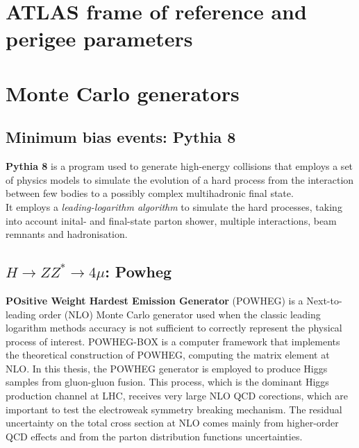 \documentclass[a4paper,twoside,12pt]{article}
\begin{document}
\begin{appendices}
\section{ATLAS frame of reference and perigee parameters} \label{appendix:perigee}

\section{Monte Carlo generators}\label{appendix:MC}
\subsection{Minimum bias events: Pythia 8}
\textbf{Pythia 8} is a program used to generate high-energy collisions that employs a set of physics
models to simulate the evolution of a hard process from the interaction between few bodies 
to a possibly complex multihadronic final state\cite{Pythia8}. 	\\
It employs a \textit{leading-logarithm algorithm} to simulate the hard processes, 
taking into account inital- and final-state parton shower, multiple interactions, beam remnants
and hadronisation. 

\subsection{$H \rightarrow ZZ^* \rightarrow 4\mu$: Powheg}
\textbf{POsitive Weight Hardest Emission Generator} (POWHEG) is a Next-to-leading order (NLO) Monte Carlo generator
used when the classic leading logarithm methods accuracy is not sufficient to correctly 
represent the physical process of interest. POWHEG-BOX is a computer framework 
that implements the theoretical construction of POWHEG, computing the matrix element 
at NLO\cite{Powheg}. In this thesis, the POWHEG generator is employed to produce
Higgs samples from gluon-gluon fusion. This process, which is the dominant Higgs production 
channel at LHC, receives very large NLO QCD corections, which are important to test the 
electroweak symmetry breaking mechanism\cite{Powheg_ggH}. The residual uncertainty 
on the total cross section 
at NLO comes mainly from higher-order QCD effects and from the parton distribution
functions uncertainties.

\clearpage
\end{appendices}

\baselineskip 25pt
\baselineskip 5pt
\baselineskip 16pt

\appendix




\end{document}
